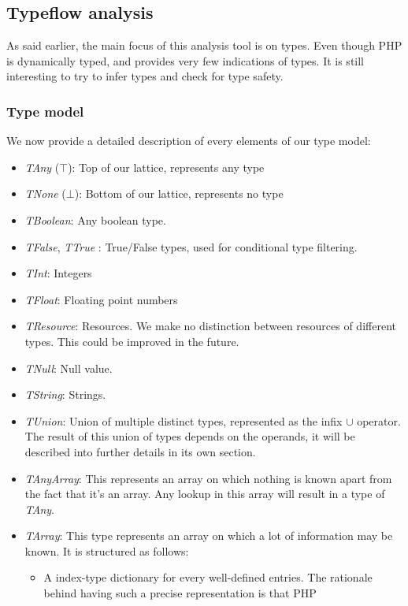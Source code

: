 \documentclass[a4paper]{article}
\begin{document}
\subsection{Typeflow analysis}
As said earlier, the main focus of this analysis tool is on types. Even though
PHP is dynamically typed, and provides very few indications of types. It is
still interesting to try to infer types and check for type safety.

\subsubsection{Type model}
We now provide a detailed description of every elements of our type model:
\begin{itemize}
  \item \emph{TAny} ($\top$): Top of our lattice, represents any type
  \item \emph{TNone} ($\bot$): Bottom of our lattice, represents no type
  \item \emph{TBoolean}: Any boolean type.
  \item \emph{TFalse}, \emph{TTrue} : True/False types, used for conditional
    type filtering.
  \item \emph{TInt}: Integers
  \item \emph{TFloat}: Floating point numbers
  \item \emph{TResource}: Resources. We make no distinction between resources
    of different types. This could be improved in the future.
  \item \emph{TNull}: Null value.
  \item \emph{TString}: Strings.
  \item \emph{TUnion}: Union of multiple distinct types, represented as the
    infix $\cup$ operator. The result of this union of types depends on the operands,
    it will be described into further details in its own section.
  \item \emph{TAnyArray}: This represents an array on which nothing is known
    apart from the fact that it's an array. Any lookup in this array will
    result in a type of \emph{TAny}.
  \item \emph{TArray}: This type represents an array on which a lot of information
    may be known. It is structured as follows:
    \begin{itemize}
        \item A index-type dictionary for every well-defined entries. The
          rationale behind having such a precise representation is that PHP

\end{itemize}
\end{itemize}
\end{document}
